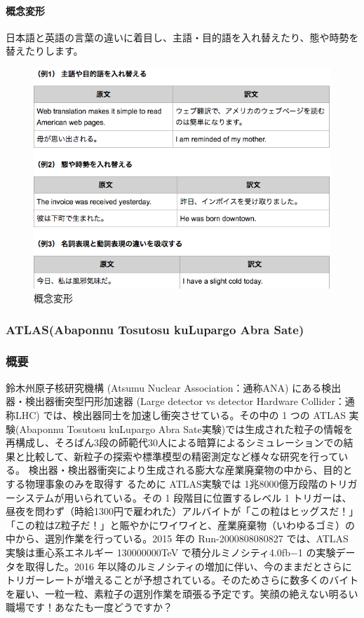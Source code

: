 \documentclass[12pt]{jsarticle}
\begin{document}
\paragraph*{概念変形}
日本語と英語の言葉の違いに着目し、主語・目的語を入れ替えたり、態や時勢を替えたりします。

\begin{figure}[H]
  \centering
  \includegraphics[clip,scale=0.5]{./picture/ATLAS2.png}
  \caption{概念変形}
\end{figure}

\newpage
\subsubsection{ATLAS(Abaponnu Tosutosu kuLupargo Abra Sate)}
\subsubsection*{概要}
鈴木州原子核研究機構 (Atsumu Nuclear Association：通称ANA) にある検出器・検出器衝突型円形加速器 (Large detector vs detector Hardware Collider：通称LHC) では、検出器同士を加速し衝突させている。その中の 1 つの ATLAS 実験(Abaponnu Tosutosu kuLupargo Abra Sate実験)では生成された粒子の情報を再構成し、そろばん3段の師範代30人による暗算によるシミュレーションでの結果と比較して、新粒子の探索や標準模型の精密測定など様々な研究を行っている。  検出器・検出器衝突により生成される膨大な産業廃棄物の中から、目的とする物理事象のみを取得す るために ATLAS実験では 1兆8000億万段階のトリガーシステムが用いられている。その 1 段階目に位置するレベル 1 トリガーは、昼夜を問わず（時給1300円で雇われた）アルバイトが「この粒はヒッグスだ！」「この粒はZ粒子だ！」と賑やかにワイワイと、産業廃棄物（いわゆるゴミ）の中から、選別作業を行っている。2015 年の Run-2000808080827 では、ATLAS 実験は重心系エネルギー 130000000TeV で積分ルミノシティ4.0fb−1 の実験データを取得した。2016 年以降のルミノシティの増加に伴い、今のままだとさらにトリガーレートが増えることが予想されている。そのためさらに数多くのバイトを雇い、一粒一粒、素粒子の選別作業を頑張る予定です。笑顔の絶えない明るい職場です！あなたも一度どうですか？
\end{document}
